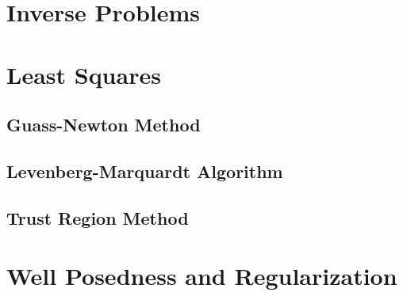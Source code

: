 \section{Inverse Problems} \label{inverse}

\citet{Tarantola2005,Tarantola1982}

\section{Least Squares} \label{ls}

\subsection{Guass-Newton Method}

\subsection{Levenberg-Marquardt Algorithm}

\citet{Pujol2007}

\subsection{Trust Region Method}

\citet{kelley1999iterative}

\section{Well Posedness and Regularization}

\citet{Fang2004}